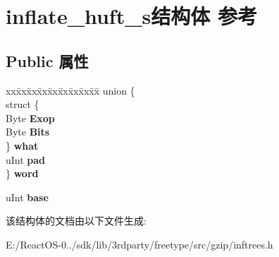 \hypertarget{structinflate__huft__s}{}\section{inflate\+\_\+huft\+\_\+s结构体 参考}
\label{structinflate__huft__s}
\subsection*{Public 属性}
\begin{DoxyCompactItemize}
\item 
\mbox{\label{structinflate__huft__s_ae0fab2f42cccc45441bf62da9c7eb11f}} 
\begin{tabbing}
xx\=xx\=xx\=xx\=xx\=xx\=xx\=xx\=xx\=\kill
union \{\\
\>struct \{\\
\>\>Byte {\bfseries Exop}\\
\>\>Byte {\bfseries Bits}\\
\>\} {\bfseries what}\\
\>uInt {\bfseries pad}\\
\} {\bfseries word}\\

\end{tabbing}\item 
\mbox{\label{structinflate__huft__s_a58a53b1d36c6cfc032646dc64def6cb3}} 
u\+Int {\bfseries base}
\end{DoxyCompactItemize}


该结构体的文档由以下文件生成\+:\begin{DoxyCompactItemize}
\item 
E\+:/\+React\+O\+S-\/0../sdk/lib/3rdparty/freetype/src/gzip/inftrees.\+h\end{DoxyCompactItemize}
